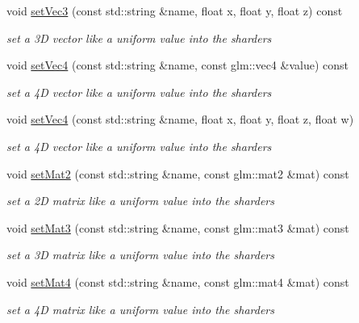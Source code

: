\begin{DoxyCompactItemize}
void \mbox{\hyperlink{class_shader_a90092c25b7dc23964c465b93887300f9}{set\+Vec3}} (const std\+::string \&name, float x, float y, float z) const
\begin{DoxyCompactList}\small\item\em set a 3D vector like a uniform value into the sharders \end{DoxyCompactList}\item 
void \mbox{\hyperlink{class_shader_a79cbe674f6bf1a576a48045dcb924de5}{set\+Vec4}} (const std\+::string \&name, const glm\+::vec4 \&value) const
\begin{DoxyCompactList}\small\item\em set a 4D vector like a uniform value into the sharders \end{DoxyCompactList}\item 
void \mbox{\hyperlink{class_shader_a913e10fe2501b00746ae6901b97a1730}{set\+Vec4}} (const std\+::string \&name, float x, float y, float z, float w)
\begin{DoxyCompactList}\small\item\em set a 4D vector like a uniform value into the sharders \end{DoxyCompactList}\item 
void \mbox{\hyperlink{class_shader_a91a6ee79b959cacd618c9e29a5bbd732}{set\+Mat2}} (const std\+::string \&name, const glm\+::mat2 \&mat) const
\begin{DoxyCompactList}\small\item\em set a 2D matrix like a uniform value into the sharders \end{DoxyCompactList}\item 
void \mbox{\hyperlink{class_shader_a3e24fcad187493dfebaa12939072e91d}{set\+Mat3}} (const std\+::string \&name, const glm\+::mat3 \&mat) const
\begin{DoxyCompactList}\small\item\em set a 3D matrix like a uniform value into the sharders \end{DoxyCompactList}\item 
void \mbox{\hyperlink{class_shader_a8e711c96f3e1722cbfb88fde9478977c}{set\+Mat4}} (const std\+::string \&name, const glm\+::mat4 \&mat) const
\begin{DoxyCompactList}\small\item\em set a 4D matrix like a uniform value into the sharders \end{DoxyCompactList}\end{DoxyCompactItemize}


